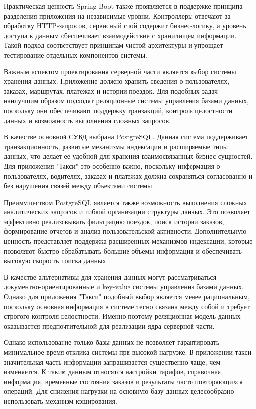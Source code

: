{	\par \redline Практическая ценность Spring Boot также проявляется в поддержке принципа разделения приложения на независимые уровни. Контроллеры отвечают за обработку HTTP-запросов, сервисный слой содержит бизнес-логику, а уровень доступа к данным обеспечивает взаимодействие с хранилищем информации. Такой подход соответствует принципам чистой архитектуры и упрощает тестирование отдельных компонентов системы.
	
	\par \redline Важным аспектом проектирования серверной части является выбор системы хранения данных. Приложение должно хранить сведения о пользователях, заказах, маршрутах, платежах и истории поездок. Для подобных задач наилучшим образом подходят реляционные системы управления базами данных, поскольку они обеспечивают поддержку транзакций, контроль целостности данных и возможность выполнения сложных запросов.
	
	\par \redline В качестве основной СУБД выбрана PostgreSQL. Данная система поддерживает транзакционность, развитые механизмы индексации и расширяемые типы данных, что делает ее удобной для хранения взаимосвязанных бизнес-сущностей. Для приложения "Такси"{} это особенно важно, поскольку информация о пользователях, водителях, заказах и платежах должна сохраняться согласованно и без нарушения связей между объектами системы.
	
	\par \redline Преимуществом PostgreSQL является также возможность выполнения сложных аналитических запросов и гибкой организации структуры данных. Это позволяет эффективно реализовывать фильтрацию поездок, поиск истории заказов, формирование отчетов и анализ пользовательской активности. Дополнительную ценность представляет поддержка расширенных механизмов индексации, которые позволяют быстро обрабатывать большие объемы информации и обеспечивать высокую скорость поиска данных.
	
	\par \redline В качестве альтернативы для хранения данных могут рассматриваться документно-ориентированные и key-value системы управления базами данных. Однако для приложения "Такси"{} подобный выбор является менее рациональным, поскольку основная информация в системе тесно связана между собой и требует строгого контроля целостности. Именно поэтому реляционная модель данных оказывается предпочтительной для реализации ядра серверной части.
	
	\par \redline Однако использование только базы данных не позволяет гарантировать минимальное время отклика системы при высокой нагрузке. В приложении такси значительная часть информации запрашивается существенно чаще, чем изменяется. К таким данным относятся настройки тарифов, справочная информация, временные состояния заказов и результаты часто повторяющихся операций. Для снижения нагрузки на основную базу данных целесообразно использовать механизм кэширования.
	
}
